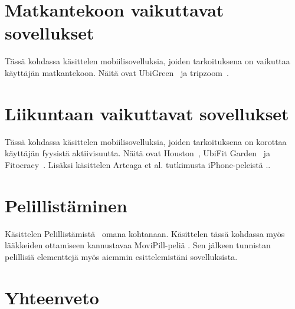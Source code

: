 \documentclass[finnish]{tktltiki2}
\theoremstyle{definition}
\theoremstyle{remark}
\begin{document}
\section{Matkantekoon vaikuttavat sovellukset}

Tässä kohdassa käsittelen mobiilisovelluksia, joiden tarkoituksena on vaikuttaa käyttäjän matkantekoon. Näitä ovat UbiGreen~\cite{ubigreen} ja tripzoom~\cite{tripzoom}.

\section{Liikuntaan vaikuttavat sovellukset}

Tässä kohdassa käsittelen mobiilisovelluksia, joiden tarkoituksena on korottaa käyttäjän fyysistä aktiivisuutta. Näitä ovat Houston~\cite{houston}, UbiFit Garden~\cite{ubifit} ja Fitocracy~\cite{fitocracy}. Lisäksi käsittelen Arteaga et al. tutkimusta iPhone-peleistä \cite{obesity}..

\section{Pelillistäminen}

Käsittelen Pelillistämistä~\cite{gamification} omana kohtanaan. Käsittelen tässä kohdassa myös lääkkeiden ottamiseen kannustavaa MoviPill-peliä \cite{movipill}.
Sen jälkeen tunnistan pelillisiä elementtejä myös aiemmin esittelemistäni sovelluksista.

\section{Yhteenveto}

%
%
% 
%







% 
\end{document}
